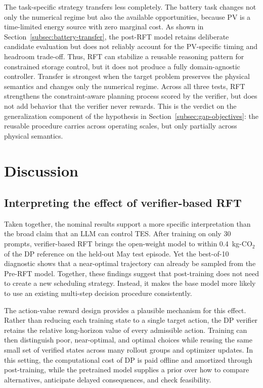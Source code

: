 \documentclass[11pt]{article}
\begin{document}
The task-specific strategy transfers less completely. The battery task changes not only the numerical regime but also the available opportunities, because PV is a time-limited energy source with zero marginal cost. As shown in Section~\ref{subsec:battery-transfer}, the post-RFT model retains deliberate candidate evaluation but does not reliably account for the PV-specific timing and headroom trade-off. Thus, RFT can stabilize a reusable reasoning pattern for constrained storage control, but it does not produce a fully domain-agnostic controller. Transfer is strongest when the target problem preserves the physical semantics and changes only the numerical regime. Across all three tests, RFT strengthens the constraint-aware planning process scored by the verifier, but does not add behavior that the verifier never rewards. This is the verdict on the generalization component of the hypothesis in Section~\ref{subsec:gap-objectives}: the reusable procedure carries across operating scales, but only partially across physical semantics.

\section{Discussion}\label{sec:discussion}
\subsection{Interpreting the effect of verifier-based RFT}\label{subsec:why-it-works}
Taken together, the nominal results support a more specific interpretation than the broad claim that an LLM can control TES. After training on only 30 prompts, verifier-based RFT brings the open-weight model to within 0.4~kg-CO$_2$ of the DP reference on the held-out May test episode. Yet the best-of-10 diagnostic shows that a near-optimal trajectory can already be sampled from the Pre-RFT model. Together, these findings suggest that post-training does not need to create a new scheduling strategy. Instead, it makes the base model more likely to use an existing multi-step decision procedure consistently.

The action-value reward design provides a plausible mechanism for this effect. Rather than reducing each training state to a single target action, the DP verifier retains the relative long-horizon value of every admissible action. Training can then distinguish poor, near-optimal, and optimal choices while reusing the same small set of verified states across many rollout groups and optimizer updates. In this setting, the computational cost of DP is paid offline and amortized through post-training, while the pretrained model supplies a prior over how to compare alternatives, anticipate delayed consequences, and check feasibility.
\end{document}
